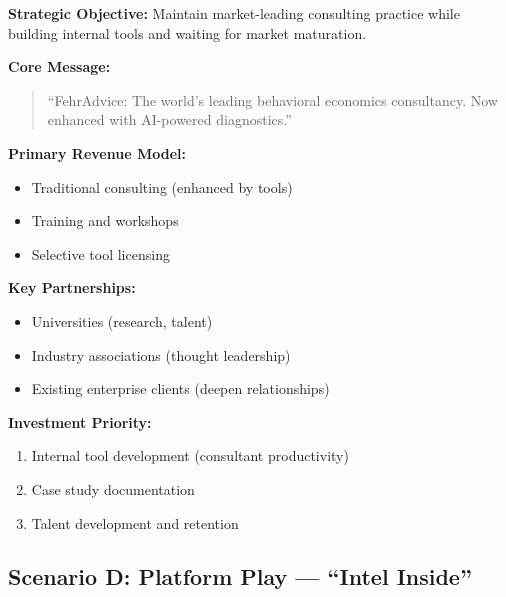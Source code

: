 \begin{tcolorbox}[colback=gray!5!white, colframe=gray!75!black,
    title=Strategic Position C: Consulting Excellence + Tools]

\textbf{Strategic Objective:}
Maintain market-leading consulting practice while building internal tools and waiting for market maturation.

\textbf{Core Message:}
\begin{quote}
``FehrAdvice: The world's leading behavioral economics consultancy. Now enhanced with AI-powered diagnostics.''
\end{quote}

\textbf{Primary Revenue Model:}
\begin{itemize}[nosep]
\item Traditional consulting (enhanced by tools)
\item Training and workshops
\item Selective tool licensing
\end{itemize}

\textbf{Key Partnerships:}
\begin{itemize}[nosep]
\item Universities (research, talent)
\item Industry associations (thought leadership)
\item Existing enterprise clients (deepen relationships)
\end{itemize}

\textbf{Investment Priority:}
\begin{enumerate}[nosep]
\item Internal tool development (consultant productivity)
\item Case study documentation
\item Talent development and retention
\end{enumerate}

\end{tcolorbox}


\subsection{Scenario D: Platform Play --- ``Intel Inside''}

